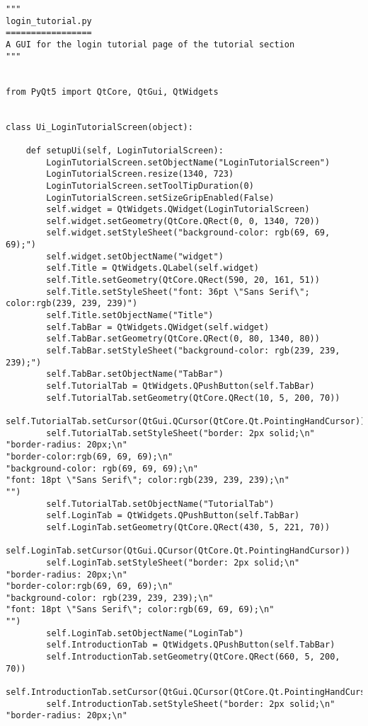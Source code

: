 \documentclass{article}
\begin{document}
\begin{lstlisting}
"""
login_tutorial.py
=================
A GUI for the login tutorial page of the tutorial section
"""


from PyQt5 import QtCore, QtGui, QtWidgets


class Ui_LoginTutorialScreen(object):

    def setupUi(self, LoginTutorialScreen):
        LoginTutorialScreen.setObjectName("LoginTutorialScreen")
        LoginTutorialScreen.resize(1340, 723)
        LoginTutorialScreen.setToolTipDuration(0)
        LoginTutorialScreen.setSizeGripEnabled(False)
        self.widget = QtWidgets.QWidget(LoginTutorialScreen)
        self.widget.setGeometry(QtCore.QRect(0, 0, 1340, 720))
        self.widget.setStyleSheet("background-color: rgb(69, 69, 69);")
        self.widget.setObjectName("widget")
        self.Title = QtWidgets.QLabel(self.widget)
        self.Title.setGeometry(QtCore.QRect(590, 20, 161, 51))
        self.Title.setStyleSheet("font: 36pt \"Sans Serif\"; color:rgb(239, 239, 239)")
        self.Title.setObjectName("Title")
        self.TabBar = QtWidgets.QWidget(self.widget)
        self.TabBar.setGeometry(QtCore.QRect(0, 80, 1340, 80))
        self.TabBar.setStyleSheet("background-color: rgb(239, 239, 239);")
        self.TabBar.setObjectName("TabBar")
        self.TutorialTab = QtWidgets.QPushButton(self.TabBar)
        self.TutorialTab.setGeometry(QtCore.QRect(10, 5, 200, 70))
        self.TutorialTab.setCursor(QtGui.QCursor(QtCore.Qt.PointingHandCursor))
        self.TutorialTab.setStyleSheet("border: 2px solid;\n"
"border-radius: 20px;\n"
"border-color:rgb(69, 69, 69);\n"
"background-color: rgb(69, 69, 69);\n"
"font: 18pt \"Sans Serif\"; color:rgb(239, 239, 239);\n"
"")
        self.TutorialTab.setObjectName("TutorialTab")
        self.LoginTab = QtWidgets.QPushButton(self.TabBar)
        self.LoginTab.setGeometry(QtCore.QRect(430, 5, 221, 70))
        self.LoginTab.setCursor(QtGui.QCursor(QtCore.Qt.PointingHandCursor))
        self.LoginTab.setStyleSheet("border: 2px solid;\n"
"border-radius: 20px;\n"
"border-color:rgb(69, 69, 69);\n"
"background-color: rgb(239, 239, 239);\n"
"font: 18pt \"Sans Serif\"; color:rgb(69, 69, 69);\n"
"")
        self.LoginTab.setObjectName("LoginTab")
        self.IntroductionTab = QtWidgets.QPushButton(self.TabBar)
        self.IntroductionTab.setGeometry(QtCore.QRect(660, 5, 200, 70))
        self.IntroductionTab.setCursor(QtGui.QCursor(QtCore.Qt.PointingHandCursor))
        self.IntroductionTab.setStyleSheet("border: 2px solid;\n"
"border-radius: 20px;\n"

\end{lstlisting}
\end{document}
